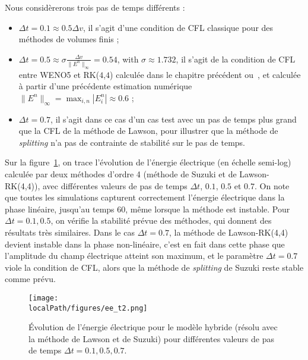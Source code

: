 Nous considèrerons trois pas de temps différents :
\begin{itemize}
  \item $\Delta t = 0.1 \approx 0.5\Delta v$, il s'agit d'une condition de CFL classique pour des méthodes de volumes finis ;
  \item $\Delta t = 0.5 \approx \sigma\frac{\Delta v}{\|E^n\|_\infty} = 0.54$, with $\sigma\approx 1.732$, il s'agit de la condition de CFL entre WENO5 et RK($4$,$4$) calculée dans le chapitre précédent ou~\cite{Crouseilles:2019b}, et calculée à partir d'une précédente estimation numérique $\|E^n\|_\infty = \max_{i,n}|E^n_i|\approx 0.6$ ;
  \item $\Delta t = 0.7$, il s'agit dans ce cas d'un cas test avec un pas de temps plus grand que la CFL de la méthode de Lawson, pour illustrer que la méthode de \emph{splitting} n'a pas de contrainte de stabilité sur le pas de temps.
\end{itemize}

Sur la figure~\ref{fig:compare:ee}, on trace l'évolution de l'énergie électrique (en échelle semi-log) calculée par deux méthodes d'ordre 4 (méthode de Suzuki et de Lawson-RK(4,4)), avec différentes valeurs de pas de temps $\Delta t$, $0.1$, $0.5$ et $0.7$. On note que toutes les simulations capturent correctement l'énergie électrique dans la phase linéaire, jusqu'au temps 60, même lorsque la méthode est instable. Pour $\Delta t=0.1,0.5$, on vérifie la stabilité prévue des méthodes, qui donnent des résultats très similaires. Dans le cas $\Delta t=0.7$, la méthode de Lawson-RK(4,4) devient instable dans la phase non-linéaire, c'est en fait dans cette phase que l'amplitude du champ électrique atteint son maximum, et le paramètre $\Delta t=0.7$ viole la condition de CFL, alors que la méthode de \emph{splitting} de Suzuki reste stable comme prévu.

\begin{figure}[h]
  \centering
  \texttt{[image: \\localPath/figures/ee\_t2.png]}
  \caption{Évolution de l'énergie électrique pour le modèle hybride (résolu avec la méthode de Lawson et de Suzuki) pour différentes valeurs de pas de temps $\Delta t=0.1,0.5,0.7$.}
  \label{fig:compare:ee}
\end{figure}


